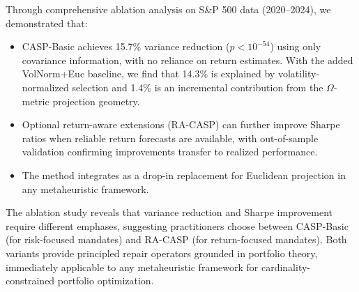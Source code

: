 \documentclass[10pt,twocolumn,a4paper]{article}
\begin{document}
Through comprehensive ablation analysis on S\&P 500 data (2020--2024), we demonstrated that:
\begin{itemize}
    \item CASP-Basic achieves 15.7\% variance reduction ($p < 10^{-54}$) using only covariance information, with no reliance on return estimates. With the added VolNorm+Euc baseline, we find that 14.3\% is explained by volatility-normalized selection and 1.4\% is an incremental contribution from the $\Omega$-metric projection geometry.
    \item Optional return-aware extensions (RA-CASP) can further improve Sharpe ratios when reliable return forecasts are available, with out-of-sample validation confirming improvements transfer to realized performance.
    \item The method integrates as a drop-in replacement for Euclidean projection in any metaheuristic framework.
\end{itemize}

The ablation study reveals that variance reduction and Sharpe improvement require different emphases, suggesting practitioners choose between CASP-Basic (for risk-focused mandates) and RA-CASP (for return-focused mandates). Both variants provide principled repair operators grounded in portfolio theory, immediately applicable to any metaheuristic framework for cardinality-constrained portfolio optimization.
\end{document}
